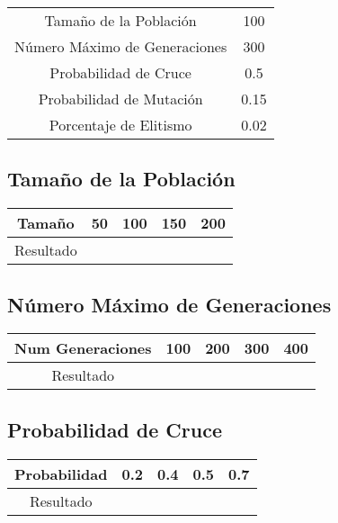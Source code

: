 \documentclass[12pt]{article}
\begin{document}
\begin{table}[H]
\begin{center}
\begin{tabular}{|cc|} \hline
Tamaño de la Población   & 100  \\  
Número Máximo de Generaciones  &  300 \\
Probabilidad de Cruce & 0.5 \\
Probabilidad de Mutación & 0.15 \\
Porcentaje de Elitismo & 0.02 \\ \hline
\end{tabular}
\end{center}
\end{table}


\subsection{Tamaño de la Población}

\begin{table}[H]
\begin{center}
\begin{tabular}{|ccccc|} \hline
Tamaño	   & 50 & 100 & 150 & 200 \\  \hline
Resultado  &   &  &  &  \\ \hline
\end{tabular}
\end{center}
\end{table}

	

\subsection{Número Máximo de Generaciones}
\begin{table}[H]
\begin{center}
\begin{tabular}{|ccccc|} \hline
Num Generaciones  & 100 & 200 & 300 & 400 \\  \hline
Resultado  &   &  &  &  \\ \hline
\end{tabular}
\end{center}
\end{table}	

	

\subsection{Probabilidad de Cruce}
\begin{table}[H]
\begin{center}
\begin{tabular}{|ccccc|} \hline
Probabilidad   & 0.2 & 0.4 & 0.5 & 0.7 \\  \hline
Resultado  &   &  &  &  \\ \hline
\end{tabular}
\end{center}
\end{table}
\end{document}
